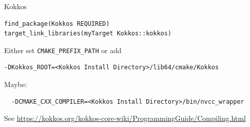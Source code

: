 \begin{numberedframe}{Kokkos}
\begin{lstlisting}
find_package(Kokkos REQUIRED)
target_link_libraries(myTarget Kokkos::kokkos)
\end{lstlisting}
Either set \lstinline{CMAKE_PREFIX_PATH} or add
\begin{lstlisting}
-DKokkos_ROOT=<Kokkos Install Directory>/lib64/cmake/Kokkos
\end{lstlisting}
Maybe:
\begin{lstlisting}
  -DCMAKE_CXX_COMPILER=<Kokkos Install Directory>/bin/nvcc_wrapper
\end{lstlisting}
See \url{https://kokkos.org/kokkos-core-wiki/ProgrammingGuide/Compiling.html}
\end{numberedframe}

\endinput

\begin{numberedframe}{MPI from C}
  \tiny
  \lstset{numbers=left,numberstyle=\tiny}
  
\end{numberedframe}

\begin{numberedframe}{MPI from Fortran}
  \tiny
  \lstset{numbers=left,numberstyle=\tiny}
  
\end{numberedframe}

